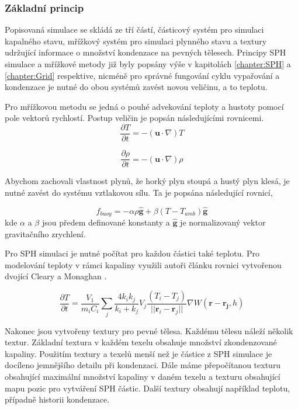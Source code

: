 \subsubsection{Základní princip}
Popisovaná simulace se skládá ze tří částí, částicový systém pro simulaci kapalného stavu, mřížkový systém pro simulaci plynného stavu a textury udržující informace o množství kondenzace na pevných tělesech. Principy SPH simulace a mřížkové metody již byly popsány výše v kapitolách \ref{chapter:SPH} a \ref{chapter:Grid} respektive, nicméně pro správné fungování cyklu vypařování a kondenzace je nutné do obou systémů zavést novou veličinu, a to teplotu. 

Pro mřížkovou metodu se jedná o pouhé advekování teploty a hustoty pomocí pole vektorů rychlostí. Postup veličin je popsán následujícími rovnicemi.
\begin{equation}
    \frac{\partial T}{\partial t} = -(\mathbf{u} \cdot \nabla)T
\end{equation}

\begin{equation}
    \frac{\partial \rho}{\partial t} = -(\mathbf{u} \cdot \nabla)\rho
\end{equation}

Abychom zachovali vlastnost plynů, že horký plyn stoupá a hustý plyn klesá, je nutné zavést do systému vztlakovou sílu. Ta je popsána následující rovnicí,

\begin{equation}
    f_{buoy} = -\alpha \rho \hat{\mathbf{g}} + \beta(T - T_{amb})\hat{\mathbf{g}}
\end{equation}
kde $\alpha$ a $\beta$ jsou předem definované konstanty a $\hat{\mathbf{g}}$ je normalizovaný vektor gravitačního zrychlení.

Pro SPH simulaci je nutné počítat pro každou částici také teplotu. Pro modelování teploty v rámci kapaliny využili autoři článku rovnici vytvořenou dvojící Cleary a Monaghan \cite{Cleary99}.

\begin{equation}
    \frac{\partial T}{\partial t} = \frac{V_1}{m_i C_i} \sum_j \frac{4 k_i k_j}{k_i + k_j} V_j \frac{(T_i - T_j)}{||\mathbf{r}_i - \mathbf{r}_j||}\nabla W(\mathbf{r} - \mathbf{r_j},h)
\end{equation}

Nakonec jsou vytvořeny textury pro pevné tělesa. Každému tělesu náleží několik textur. Základní textura v každém texelu obsahuje množství zkondenzované kapaliny. Použitím textury a texelů menší než je částice z SPH simulace je docíleno jemnějšího detailu při kondenzaci. Dále máme přepočítanou texturu obsahující maximální množství kapaliny v daném texelu a texturu obsahující mapu pozic pro vytváření SPH částic. Další textury obsahují například teplotu, případně historii kondenzace.

